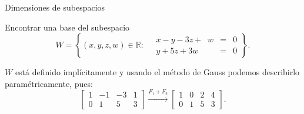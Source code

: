 \documentclass[handout]{beamer} %
\begin{document}
\begin{frame}{Dimensiones de subespacios}
\pause
{}

\vskip 3cm

\end{frame}


\begin{frame}
        
\begin{ejemplo}
    Encontrar una base del subespacio 
    $$
    W = \left\{(x,y,z,w) \in \mathbb{R}: \quad\begin{array}{rcl}
    x-y -3z +\;\;w &=& 0 \\ y +5z +3w &=& 0
    \end{array} \right\}.
    $$
\end{ejemplo}\pause
\begin{solucion}\pause
    $W$  está definido implícitamente y usando el método de Gauss podemos describirlo paramétricamente, pues:
    \begin{equation*}
    \begin{bmatrix}1&-1&-3&1 \\ 0&1&5&3  \end{bmatrix}
    \stackrel{F_1+F_2}{\longrightarrow} 
    \begin{bmatrix}1&0&2&4 \\ 0&1&5&3  \end{bmatrix}.
    \end{equation*}
\end{solucion}
\end{frame}
\end{document}
